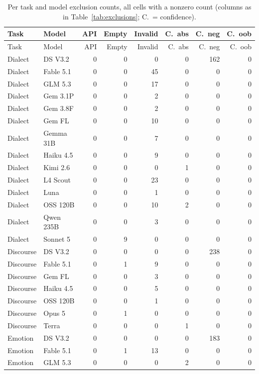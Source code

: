 \begin{longtable}{llrrrrrr}
\caption{Per task and model exclusion counts, all cells with a nonzero count (columns as in Table~\ref{tab:exclusions}; C.\ = confidence).}\label{tab:exclusions_full}\\
\toprule
Task & Model & API & Empty & Invalid & C.\ abs & C.\ neg & C.\ oob \\
\midrule
\endfirsthead
\toprule
Task & Model & API & Empty & Invalid & C.\ abs & C.\ neg & C.\ oob \\
\midrule
\endhead
\bottomrule
\endfoot
Dialect & DS V3.2 & 0 & 0 & 0 & 0 & 162 & 0 \\
Dialect & Fable 5.1 & 0 & 0 & 45 & 0 & 0 & 0 \\
Dialect & GLM 5.3 & 0 & 0 & 17 & 0 & 0 & 0 \\
Dialect & Gem 3.1P & 0 & 0 & 2 & 0 & 0 & 0 \\
Dialect & Gem 3.8F & 0 & 0 & 2 & 0 & 0 & 0 \\
Dialect & Gem FL & 0 & 0 & 10 & 0 & 0 & 0 \\
Dialect & Gemma 31B & 0 & 0 & 7 & 0 & 0 & 0 \\
Dialect & Haiku 4.5 & 0 & 0 & 9 & 0 & 0 & 0 \\
Dialect & Kimi 2.6 & 0 & 0 & 0 & 1 & 0 & 0 \\
Dialect & L4 Scout & 0 & 0 & 23 & 0 & 0 & 0 \\
Dialect & Luna & 0 & 0 & 1 & 0 & 0 & 0 \\
Dialect & OSS 120B & 0 & 0 & 10 & 2 & 0 & 0 \\
Dialect & Qwen 235B & 0 & 0 & 3 & 0 & 0 & 0 \\
Dialect & Sonnet 5 & 0 & 9 & 0 & 0 & 0 & 0 \\
Discourse & DS V3.2 & 0 & 0 & 0 & 0 & 238 & 0 \\
Discourse & Fable 5.1 & 0 & 1 & 9 & 0 & 0 & 0 \\
Discourse & Gem FL & 0 & 0 & 3 & 0 & 0 & 0 \\
Discourse & Haiku 4.5 & 0 & 0 & 5 & 0 & 0 & 0 \\
Discourse & OSS 120B & 0 & 0 & 1 & 0 & 0 & 0 \\
Discourse & Opus 5 & 0 & 1 & 0 & 0 & 0 & 0 \\
Discourse & Terra & 0 & 0 & 0 & 1 & 0 & 0 \\
Emotion & DS V3.2 & 0 & 0 & 0 & 0 & 183 & 0 \\
Emotion & Fable 5.1 & 0 & 1 & 13 & 0 & 0 & 0 \\
Emotion & GLM 5.3 & 0 & 0 & 0 & 2 & 0 & 0 \\

\end{longtable}
